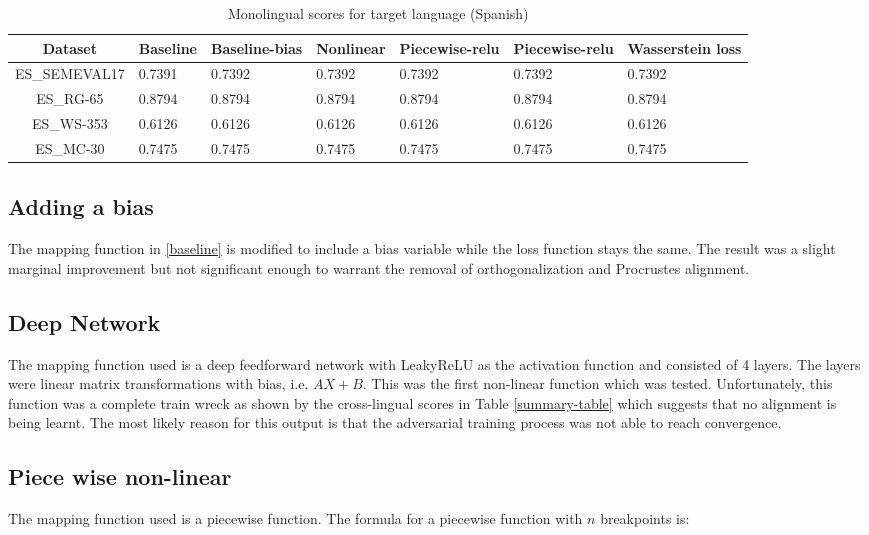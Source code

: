 \documentclass[11pt]{article}
\begin{document}
\begin{table*}[ht]
  \begin{center}
  \begin{tabular}{|c|l|l|l|l|l|l|}
  \hline
  Dataset & Baseline & Baseline-bias & Nonlinear & Piecewise-relu & Piecewise-relu & Wasserstein loss\\
  \hline
  ES\_SEMEVAL17 & 0.7391 & 0.7392 & 0.7392 & 0.7392 & 0.7392 & 0.7392 \\
  \hline
  ES\_RG-65 & 0.8794 & 0.8794 & 0.8794 & 0.8794 & 0.8794 & 0.8794 \\
  \hline
  ES\_WS-353 & 0.6126 & 0.6126 & 0.6126 & 0.6126 & 0.6126 & 0.6126 \\
  \hline
  ES\_MC-30 & 0.7475 & 0.7475 & 0.7475 & 0.7475 & 0.7475 & 0.7475 \\
  \hline
  \end{tabular}
  \end{center}
  \caption{ Monolingual scores for target language (Spanish)}
  \label{monolingual-target}
\end{table*}

\subsection{Adding a bias}
The mapping function in \ref{baseline} is modified to include a bias variable while the loss function stays the same. The result was a slight marginal improvement but not significant enough to warrant the removal of orthogonalization and Procrustes alignment.

\subsection{Deep Network}
The mapping function used is a deep feedforward network with LeakyReLU as the activation function and consisted of 4 layers. The layers were linear matrix transformations with bias, i.e. $AX + B$. This was the first non-linear function which was tested. Unfortunately, this function was a complete train wreck as shown by the cross-lingual scores in Table \ref{summary-table} which suggests that no alignment is being learnt. The most likely reason for this output is that the adversarial training process was not able to reach convergence.

\subsection{Piece wise non-linear}
The mapping function used is a piecewise function. The formula for a piecewise function with $n$ breakpoints is:
\end{document}
